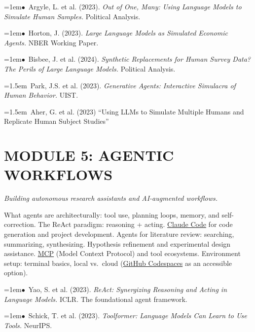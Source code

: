 \documentclass[11pt, a4paper]{article}
\newcommand{\topichead}[1]{%
  \vspace{0.8em}{\large\sffamily\bfseries\textcolor{accent}{#1}}\par\vspace{0.3em}
}
\newcommand{\seclabel}[1]{%
  \vspace{0.5em}{\normalsize\sffamily\bfseries\textcolor{accent}{#1}}\par\vspace{0.2em}
}
\newcommand{\refpaper}[1]{%
  \par\hangindent=1em\hangafter=1\noindent\textcolor{accent}{\small$\bullet$}~{\small #1}\par
}
\newcommand{\resource}[1]{%
  \par\hangindent=1.5em\hangafter=1\noindent\hspace{0.5em}{\small\textcolor{accent}{\guilsinglright}}~{\small #1}\par
}
\begin{document}
\refpaper{Argyle, L. et al. (2023). \textit{Out of One, Many: Using Language Models to Simulate Human Samples.} Political Analysis.}

\refpaper{Horton, J. (2023). \textit{Large Language Models as Simulated Economic Agents.} NBER Working Paper.}

\refpaper{Bisbee, J. et al. (2024). \textit{Synthetic Replacements for Human Survey Data? The Perils of Large Language Models.} Political Analysis.}

\seclabel{Further Resources}

\resource{Park, J.S. et al. (2023). \textit{Generative Agents: Interactive Simulacra of Human Behavior.} UIST.}

\resource{Aher, G. et al. (2023) ``Using LLMs to Simulate Multiple Humans and Replicate Human Subject Studies''}


\section{MODULE 5: AGENTIC WORKFLOWS}
{\textit{\textcolor{muted}{Building autonomous research assistants and AI-augmented workflows.}}}

\vspace{1em}

\topichead{Agents \& Autonomous Workflows}

\seclabel{Core Concepts}

What agents are architecturally: tool use, planning loops, memory, and self-correction. The ReAct paradigm: reasoning + acting. \href{https://docs.anthropic.com/en/docs/claude-code}{Claude Code} for code generation and project development. Agents for literature review: searching, summarizing, synthesizing. Hypothesis refinement and experimental design assistance. \href{https://modelcontextprotocol.io}{MCP} (Model Context Protocol) and tool ecosystems. Environment setup: terminal basics, local vs.\ cloud (\href{https://github.com/features/codespaces}{GitHub Codespaces} as an accessible option).

\seclabel{Core Readings}

\refpaper{Yao, S. et al. (2023). \textit{ReAct: Synergizing Reasoning and Acting in Language Models.} ICLR. The foundational agent framework.}

\refpaper{Schick, T. et al. (2023). \textit{Toolformer: Language Models Can Learn to Use Tools.} NeurIPS.}
\end{document}
